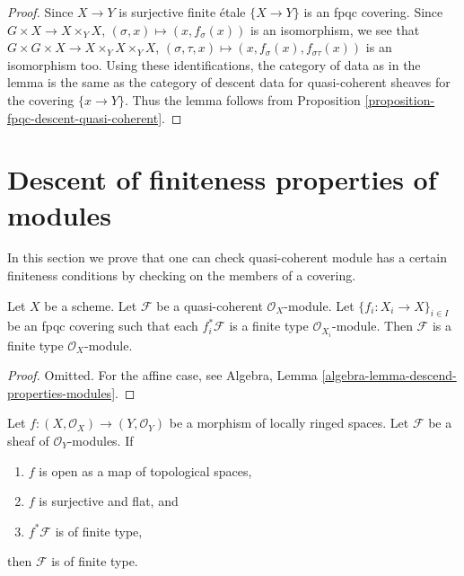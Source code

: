 \begin{proof}
Since $X \to Y$ is surjective finite \'etale $\{X \to Y\}$ is
an fpqc covering. Since
$G \times X \to X \times_Y X$, $(\sigma, x) \mapsto (x, f_\sigma(x))$
is an isomorphism, we see that
$G \times G \times X \to X \times_Y X \times_Y X$,
$(\sigma, \tau, x) \mapsto (x, f_\sigma(x), f_{\sigma\tau}(x))$
is an isomorphism too. Using these identifications, the category of
data as in the lemma is the same as the category of descent data
for quasi-coherent sheaves for the covering $\{x \to Y\}$.
Thus the lemma follows from
Proposition \ref{proposition-fpqc-descent-quasi-coherent}.
\end{proof}









\section{Descent of finiteness properties of modules}
\label{section-descent-finiteness}

\noindent
In this section we prove that one can check quasi-coherent module
has a certain finiteness conditions by checking on the members of
a covering.

\begin{lemma}
\label{lemma-finite-type-descends}
Let $X$ be a scheme.
Let $\mathcal{F}$ be a quasi-coherent $\mathcal{O}_X$-module.
Let $\{f_i : X_i \to X\}_{i \in I}$ be an fpqc covering such that
each $f_i^*\mathcal{F}$ is a finite type $\mathcal{O}_{X_i}$-module.
Then $\mathcal{F}$ is a finite type $\mathcal{O}_X$-module.
\end{lemma}

\begin{proof}
Omitted. For the affine case, see
Algebra, Lemma \ref{algebra-lemma-descend-properties-modules}.
\end{proof}

\begin{lemma}
\label{lemma-finite-type-descends-fppf}
Let $f : (X, \mathcal{O}_X) \to (Y, \mathcal{O}_Y)$ be a morphism of
locally ringed spaces. Let $\mathcal{F}$ be a sheaf of $\mathcal{O}_Y$-modules.
If
\begin{enumerate}
\item $f$ is open as a map of topological spaces,
\item $f$ is surjective and flat, and
\item $f^*\mathcal{F}$ is of finite type,
\end{enumerate}
then $\mathcal{F}$ is of finite type.
\end{lemma}


